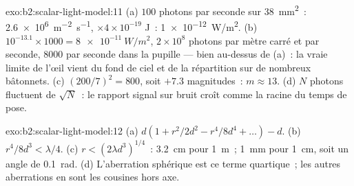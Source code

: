 \begin{solution}{exo:b2:scalar-light-model:11}
(a) $100$ photons par seconde sur \qty{38}{mm^2}~: \qty{2.6e6}{m^{-2}.s^{-1}}, $\times4 \times
10^{-19}$ J~: \qty{1e-12}{W/m^2}. (b) $10^{-13.1} \times 1000 = \qty{8e-11}{W/m^2}$, $2 \times 10^8$
photons par mètre carré et par seconde, $8000$ par seconde dans la pupille
--- bien au-dessus de (a)~: la vraie limite de l'œil vient du fond de ciel et de
la répartition sur de nombreux bâtonnets. (c) $(200/7)^2 = 800$, soit $+7.3$ magnitudes~: $m \approx
13$. (d) $N$ photons fluctuent de $\sqrt N$~: le rapport signal sur bruit croît comme
la racine du temps de pose.
\end{solution}

\begin{solution}{exo:b2:scalar-light-model:12}
(a) $d(1 + r^2/2d^2 - r^4/8d^4 + \dots) - d$. (b) $r^4/8d^3 < \lambda/4$. (c) $r <
(2\lambda d^3)^{1/4}$~: \qty{3.2}{cm} pour \qty{1}{m}~; \qty{1}{mm} pour \qty{1}{cm}, soit un angle de
\qty{0.1}{rad}. (d) L'aberration sphérique est ce terme quartique~; les autres
aberrations en sont les cousines hors axe.
\end{solution}

